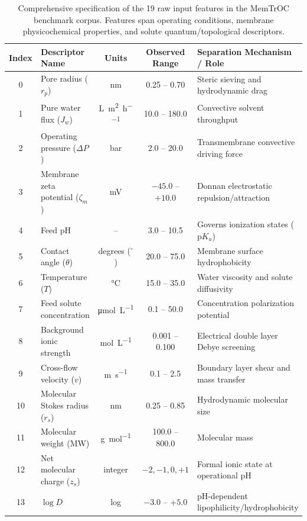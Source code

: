 \documentclass[11pt]{article}
\begin{document}
\begin{table}[H]
\centering
\footnotesize
\renewcommand{\arraystretch}{0.84}
\setlength{\tabcolsep}{3.0pt}
\caption{Comprehensive specification of the 19 raw input features in the MemTrOC benchmark corpus. Features span operating conditions, membrane physicochemical properties, and solute quantum/topological descriptors.}
\label{tab:s1_descriptors}
\begin{tabularx}{\textwidth}{c l c c >{\raggedright\arraybackslash}X}
\toprule
Index & Descriptor Name & Units & Observed Range & Separation Mechanism / Role \\
\midrule
0  & Pore radius ($r_p$)         & \si{\nano\meter} & 0.25 -- 0.70 & Steric sieving and hydrodynamic drag \\
1  & Pure water flux ($J_w$)     & \si{\liter\per\meter\squared\per\hour} & 10.0 -- 180.0 & Convective solvent throughput \\
2  & Operating pressure ($\Delta P$) & \si{\bar} & 2.0 -- 20.0 & Transmembrane convective driving force \\
3  & Membrane zeta potential ($\zeta_m$) & \si{\milli\volt} & $-45.0$ -- $+10.0$ & Donnan electrostatic repulsion/attraction \\
4  & Feed pH                     & -- & 3.0 -- 10.5 & Governs ionization states ($\text{p}K_a$) \\
5  & Contact angle ($\theta$)    & degrees ($^\circ$) & 20.0 -- 75.0 & Membrane surface hydrophobicity \\
6  & Temperature ($T$)           & \si{\celsius} & 15.0 -- 35.0 & Water viscosity and solute diffusivity \\
7  & Feed solute concentration   & \si{\micro\mol\per\liter} & 0.1 -- 50.0 & Concentration polarization potential \\
8  & Background ionic strength   & \si{\mol\per\liter} & 0.001 -- 0.100 & Electrical double layer Debye screening \\
9  & Cross-flow velocity ($v$)   & \si{\meter\per\second} & 0.1 -- 2.5 & Boundary layer shear and mass transfer \\
10 & Molecular Stokes radius ($r_s$) & \si{\nano\meter} & 0.25 -- 0.85 & Hydrodynamic molecular size \\
11 & Molecular weight (MW)       & \si{\gram\per\mol} & 100.0 -- 800.0 & Molecular mass \\
12 & Net molecular charge ($z_s$)& integer & $-2, -1, 0, +1$ & Formal ionic state at operational pH \\
13 & $\log D$                    & log & $-3.0$ -- $+5.0$ & pH-dependent lipophilicity/hydrophobicity \\

\end{tabularx}
\end{table}
\end{document}
